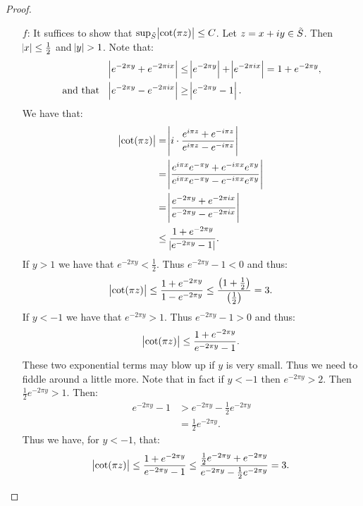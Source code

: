 \begin{proof}
\begin{enumerate}
    \item[$f$:] It suffices to show that $\sup_{\Tilde{S}} \abs{\cot(\pi z)} \leq C $. Let $z = x+iy \in \Tilde{S}$. Then $\abs{x} \leq \frac{1}{2}$ and $\abs{y} > 1$. Note that:
    \begin{align*}
        \abs{e^{-2 \pi y} + e^{-2 \pi i x}} &\leq \abs{e^{-2 \pi y} } + \abs{ e^{-2 \pi i x}} = 1+e^{-2 \pi y}, \\
        \text{and that } \;\; \abs{e^{-2 \pi y} - e^{-2 \pi i x}} &\geq \abs{e^{-2\pi y} -1}.
    \end{align*}
    We have that:
    \begin{align*}
        \abs{\cot(\pi z)} &= \abs{i \cdot  \frac{e^{i \pi z} + e^{-i \pi z}}{e^{i \pi z} - e^{-i \pi z}}}\\
        &= \abs{\frac{e^{i \pi x} e^{- \pi y} + e^{-i \pi x} e^{\pi y}}{e^{i \pi x}e^{-\pi y} - e^{-i \pi x} e^{\pi y}}}\\
        &= \abs{ \frac{ e^{-2 \pi y} + e^{-2 \pi i x} }{ e^{-2 \pi y} - e^{ - 2 \pi i x}}}\\
        &\leq \frac{1+e^{-2 \pi y}}{\abs{e^{-2\pi y} -1}}.
    \end{align*}
    If $y>1$ we have that $e^{-2 \pi y} < \frac{1}{2}$. Thus $e^{-2\pi y} -1 < 0$ and thus:
    \begin{align*}
        \abs{\cot(\pi z)} \leq \frac{1+e^{-2 \pi y}}{1-e^{-2\pi y}} \leq \frac{\left( 1+\frac{1}{2}  \right)}{\left( \frac{1}{2} \right)} = 3.
    \end{align*}
    If $y<-1$ we have that $e^{-2 \pi y} > 1$. Thus $e^{-2\pi y} -1 > 0$ and thus:
    \begin{align*}
        \abs{\cot(\pi z)} \leq \frac{1+e^{-2 \pi y}}{e^{-2\pi y} - 1}. 
    \end{align*}
    These two exponential terms may blow up if $y$ is very small. Thus we need to fiddle around a little more. Note that in fact if $y<-1$ then $e^{-2 \pi y} > 2$. Then $\frac{1}{2} e^{-2 \pi y} > 1$. Then:
    \begin{align*}
        e^{-2 \pi y} -1 &> e^{-2 \pi y} - \frac{1}{2} e^{-2 \pi y}\\
        &= \frac{1}{2} e^{-2 \pi y}.
    \end{align*}
    Thus we have, for $y<-1$, that:
    \begin{align*}
        \abs{\cot(\pi z)} \leq \frac{1+e^{-2 \pi y}}{e^{-2\pi y} - 1} \leq \frac{\frac{1}{2} e^{-2\pi y} +e^{-2 \pi y}}{e^{-2 \pi y} - \frac{1}{2}e^{-2 \pi y}} = 3.

\end{align*}
\end{enumerate}
\end{proof}
